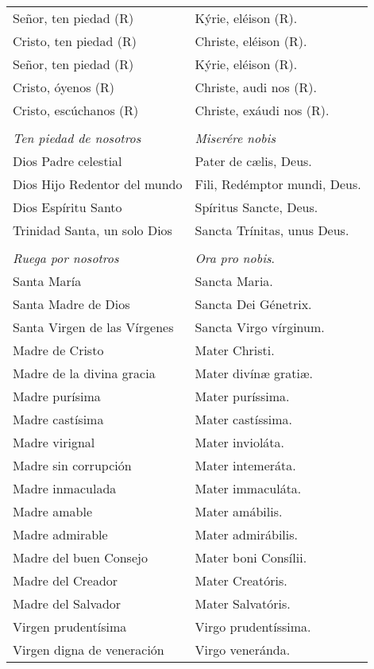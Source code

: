 \documentclass[./rosary.tex]{subfiles}
\begin{document}
\begin{longtable} { p{} p{} }
    Señor, ten piedad (R) & Kýrie, eléison (R).\\
    Cristo, ten piedad (R) & Christe, eléison (R).\\
    Señor, ten piedad (R) & Kýrie, eléison (R).\\
    Cristo, óyenos (R) & Christe, audi nos (R).\\
    Cristo, escúchanos (R) & Christe, exáudi nos (R).\\\\
    \emph{Ten piedad de nosotros} & \emph{Miserére nobis}\\
    Dios Padre celestial & Pater de cælis, Deus.\\
    Dios Hijo Redentor del mundo & Fili, Redémptor mundi, Deus.\\
    Dios Espíritu Santo & Spíritus Sancte, Deus.\\
    Trinidad Santa, un solo Dios & Sancta Trínitas, unus Deus.\\\\
    \emph{Ruega por nosotros} & \emph{Ora pro nobis}.\\
    Santa María & Sancta Maria.\\
    Santa Madre de Dios & Sancta Dei Génetrix.\\
    Santa Virgen de las Vírgenes & Sancta Virgo vírginum.\\
    Madre de Cristo & Mater Christi.\\
    Madre de la divina gracia & Mater divínæ gratiæ.\\
    Madre purísima & Mater puríssima.\\
    Madre castísima & Mater castíssima.\\
    Madre virignal & Mater invioláta.\\
    Madre sin corrupción & Mater intemeráta.\\
    Madre inmaculada & Mater immaculáta.\\
    Madre amable & Mater amábilis.\\
    Madre admirable & Mater admirábilis.\\
    Madre del buen Consejo & Mater boni Consílii.\\
    Madre del Creador & Mater Creatóris.\\
    Madre del Salvador & Mater Salvatóris.\\
    Virgen prudentísima & Virgo pru­den­tíssima.\\
    Virgen digna de veneración & Virgo veneránda.\\

\end{longtable}
\end{document}
